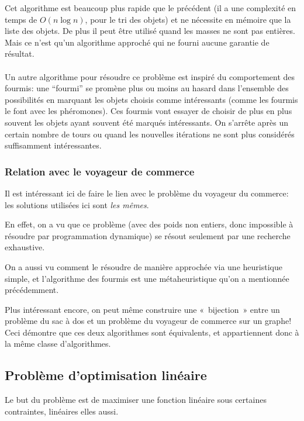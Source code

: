     Cet algorithme est beaucoup plus rapide que le précédent (il a une
    complexité en temps de $O(n \log n)$, pour le tri des objets) et ne
    nécessite en mémoire que la liste des objets. De plus il peut être utilisé
    quand les masses ne sont pas entières. Mais ce n'est qu'un algorithme
    approché qui ne fourni aucune garantie de résultat.


    \paragraph{}
    Un autre algorithme pour résoudre ce problème est inspiré du comportement
    des fourmis: une ``fourmi'' se promène plus ou moins au hasard dans
    l'ensemble des possibilités en marquant les objets choisis comme
    intéressants (comme les fourmis le font avec les phéromones). Ces fourmis
    vont essayer de choisir de plus en plus souvent les objets ayant souvent
    été marqués intéressants. On s'arrête après un certain nombre de tours ou
    quand les nouvelles itérations ne sont plus considérés suffisamment
    intéressantes.

  \subsubsection{Relation avec le voyageur de commerce}
    Il est intéressant ici de faire le lien avec le problème du voyageur
    du commerce: les solutions utilisées ici sont \emph{les mêmes}.

    En effet, on a vu que ce problème (avec des poids non entiers, donc impossible
    à résoudre par programmation dynamique) se résout seulement par une recherche
    exhaustive.
    
    On a aussi vu comment le résoudre de manière approchée via une heuristique
    simple, et l'algorithme des fourmis est une métaheuristique qu'on a mentionnée
    précédemment.


    Plus intéressant encore, on peut même construire une «~bijection~» entre un
    problème du sac à dos
    et un problème du voyageur de commerce sur un graphe! \cite{knapsack_to_tsp}
    Ceci démontre que ces deux algorithmes sont équivalents, et appartiennent donc à la même
    classe d'algorithmes. %

\subsection{Problème d'optimisation linéaire}
  Le but du problème est de maximiser une fonction linéaire sous certaines
  contraintes, linéaires elles aussi.

